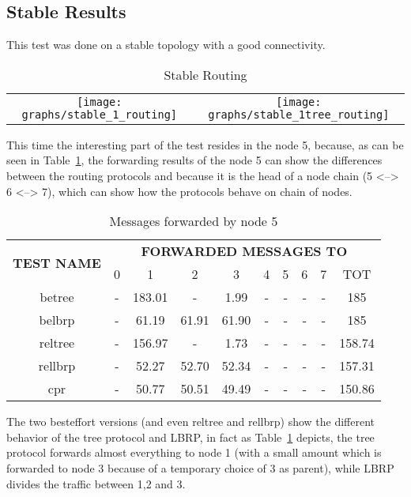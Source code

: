 \documentclass{article}
\begin{document}
	\subsection{Stable Results}
This test was done on a stable topology with a good connectivity.
		\begin{table}[H]
			\centering
			\begin{tabular}{cc}
				\texttt{[image: graphs/stable\_1\_routing]}&\texttt{[image: graphs/stable\_1tree\_routing]}\\
			\end{tabular}
			\caption{Stable Routing}
			\label{tab:comparisonStable}
		\end{table}
This time the interesting part of the test resides in the node 5, because, as can be seen in Table~\ref{tab:comparisonStable}, the forwarding results of the node 5 can show the differences between the routing protocols and because it is the head of a node chain (5 <--> 6 <--> 7), which can show how the protocols behave on chain of nodes.
		\begin{table}[H]
			\begin{center}
			    \begin{tabular}{|c|c|c|c|c|c|c|c|c|c|}
				    \hline
				    \multirow{2}{*}{\textbf{TEST NAME}} & \multicolumn{9}{c|}{\textbf{FORWARDED MESSAGES TO}} \\ \cline{2-10}
					& 0 & 1 & 2 & 3 & 4 & 5 & 6 & 7 & TOT \\ \hline
				    betree & - & 183.01 & - & 1.99 & - & - & - & - & 185 \\ \hline
				    belbrp & - & 61.19 & 61.91 & 61.90 & - & - & - & - & 185 \\ \hline
				    reltree & - & 156.97 & - & 1.73 & - & - & - & - & 158.74 \\ \hline
   				    rellbrp & - & 52.27 & 52.70 & 52.34 & - & - & - & - & 157.31 \\ \hline
				    cpr & - & 50.77 & 50.51 & 49.49 & - & - & - & - & 150.86 \\ \hline
			    \end{tabular}
			\end{center}	
			\caption{Messages forwarded by node 5}
			\label{tab:stableF5}
		\end{table}
The two besteffort versions (and even reltree and rellbrp) show the different behavior of the tree protocol and LBRP, in fact as Table~\ref{tab:comparisonStable} depicts, the tree protocol forwards almost everything to node 1 (with a small amount which is forwarded to node 3 because of a temporary choice of 3 as parent), while LBRP divides the traffic between 1,2 and 3.
\end{document}
